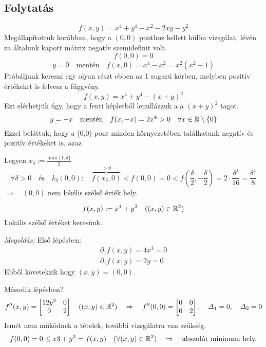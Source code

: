 \documentclass[a4paper,11.5pt]{article}
\begin{document}
	\subsection{Folytatás}
	\begin{task}
		\[ f(x,y)=x^4+y^4-x^2-2xy-y^2 \]
		Megállapítottuk korábban, hogy a $(0,0)$ ponthoz kellett külön vizsgálat, lévén za általunk kapott mátrix negatív szemidefinit volt.
		\[ f(0,0)=0 \]
		\[  y=0\quad \text{mentén}\quad f(x,0)=x^4-x^2=x^2(x^2-1) \]
		Próbáljunk keresni egy olyan részt ebben az 1 sugarú körben, melyben pozitív értékeket is felvesz a függvény.
		\[ f(x,y)=x^4+y^4-(x+y)^2 \]
		Ezt elérhetjük úgy, hogy a fenti képletből lenullázzuk a a $(x+y)^2$ tagot.
		\[ y=-x\quad \text{mentén}\quad f(x,-x)=2x^4>0\quad \forall x\in\mathbb{R}\setminus\{0\} \]
		Ezzel beláttuk, hogy a (0,0) pont minden környezetében találhatunk negatív és pozitív értékeket is, azaz
		
		Legyen $x_\delta:=\frac{\min\{1,\delta\}}{2}$
		\[ \forall\delta>0\quad \text{és}\quad k_\delta(0,0):\quad \overbrace{f(x_\delta,0)}^{>0}<f(0,0)=0<f\left(\frac{\delta}{2},-\frac{\delta}{2}\right)=2\cdot\frac{\delta^4}{16}=\frac{\delta^4}{8} \]
		$\Rightarrow \quad (0,0)$ nem lokélis szélső érték hely.
	\end{task}
	\begin{task}
		\[ f(x,y):=x^4+y^2\quad ((x,y)\in\mathbb{R}^2) \]
		Lokális szélső értéket keresünk.
		
		\textit{Megoldás:} Első lépésben:
		\begin{align*}
			\partial_1f(x,y)=4x^3=0\\
			\partial_1f(x,y)=2y=0
		\end{align*}
		Ebből követekzik hogy $(x,y)=(0,0)$.
		
		Második lépésben?
		\[ f''(x,y)=\begin{bmatrix}
			12y^2&0\\
			0&2
		\end{bmatrix}\quad ((x,y)\in\mathbb{R}^2)\quad \Rightarrow\quad f''(0,0)=\begin{bmatrix}
		0&0\\
		0&2
		\end{bmatrix},\quad \varDelta_1=0,\quad \varDelta_2=0 \]
		Ismét nem működnek a tételek, további vizsgálatra van szükség.
		\[ f(0,0)=0\leq x3+y^2=f(x,y)\quad (\forall(x,y)\in\mathbb{R}^2)\quad \Rightarrow\quad \text{abszolút minimum hely.} \]
	\end{task}
\end{document}

